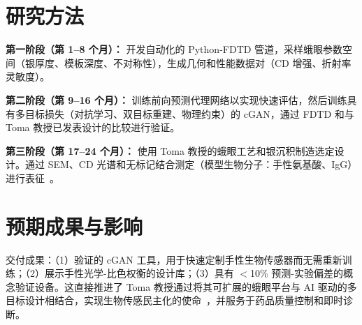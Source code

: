 \documentclass[11pt,a4paper]{article}
\begin{document}
\section*{研究方法}
\textbf{第一阶段（第 1--8 个月）：} 开发自动化的 Python-FDTD 管道，采样蛾眼参数空间（银厚度、模板深度、不对称性），生成几何和性能数据对（CD 增强、折射率灵敏度）。

\textbf{第二阶段（第 9--16 个月）：} 训练前向预测代理网络以实现快速评估，然后训练具有多目标损失（对抗学习、双目标重建、物理约束）的 cGAN，通过 FDTD 和与 Toma 教授已发表设计的比较进行验证。

\textbf{第三阶段（第 17--24 个月）：} 使用 Toma 教授的蛾眼工艺和银沉积制造选定设计。通过 SEM、CD 光谱和无标记结合测定（模型生物分子：手性氨基酸、IgG）进行表征~\cite{toma_plasmonic_metasurface,toma_enhanced_fluorescence}。

\section*{预期成果与影响}
交付成果：（1）验证的 cGAN 工具，用于快速定制手性生物传感器而无需重新训练；（2）展示手性光学-比色权衡的设计库；（3）具有 $<$10\% 预测-实验偏差的概念验证设备。这直接推进了 Toma 教授通过将其可扩展的蛾眼平台与 AI 驱动的多目标设计相结合，实现生物传感民主化的使命~\cite{toma_achievements}，并服务于药品质量控制和即时诊断。

\newpage
\printbibliography[title={参考文献}]
\end{document}
